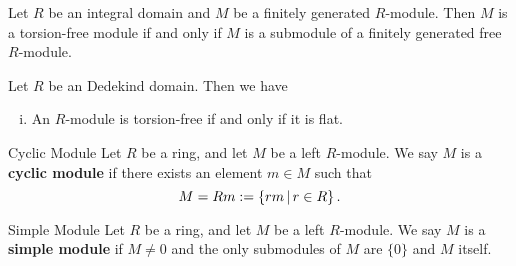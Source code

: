 \begin{proposition}{}{}
    Let $R$ be an integral domain and $M$ be a finitely generated $R$-module. Then $M$ is a torsion-free module if and only if $M$ is a submodule of a finitely generated free $R$-module.
\end{proposition}

\begin{proposition}{}{}
    Let $R$ be an Dedekind domain. Then we have
    \begin{enumerate}[(i)]
        \item An $R$-module is torsion-free if and only if it is flat.
    \end{enumerate}
\end{proposition}

\begin{definition}{Cyclic Module}{}
    Let $R$ be a ring, and let $M$ be a left $R$-module. We say $M$ is a \textbf{cyclic module} if there exists an element $m\in M$ such that 
    \[
      M=Rm:=\left\{rm\,\middle\vert\, r\in R\right\}.
    \]
\end{definition}

\begin{definition}{Simple Module}{}
    Let $R$ be a ring, and let $M$ be a left $R$-module. We say $M$ is a \textbf{simple module} if $M\neq 0$ and the only submodules of $M$ are $\{0\}$ and $M$ itself.
\end{definition}


